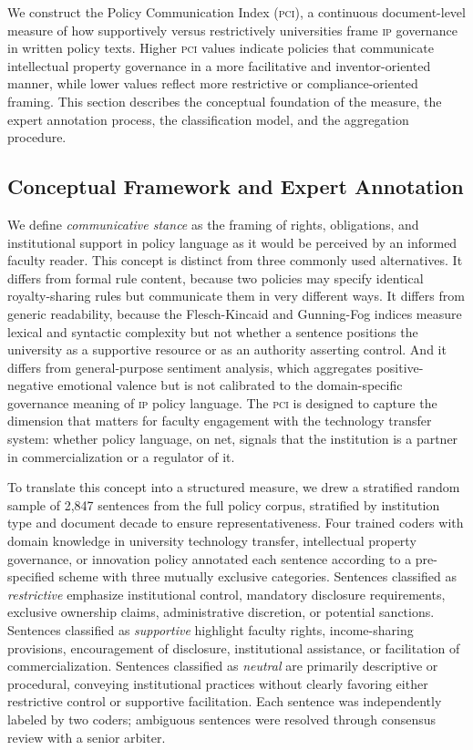 \documentclass[12pt]{article}
\newcommand{\PCI}{\textsc{pci}}
\newcommand{\IP}{\textsc{ip}}
\begin{document}
We construct the Policy Communication Index (\PCI), a continuous document-level
measure of how supportively versus restrictively universities frame \IP{} governance
in written policy texts.  Higher \PCI{} values indicate policies that communicate
intellectual property governance in a more facilitative and inventor-oriented manner,
while lower values reflect more restrictive or compliance-oriented framing.  This
section describes the conceptual foundation of the measure, the expert annotation
process, the classification model, and the aggregation procedure.

\subsection{Conceptual Framework and Expert Annotation}

We define \textit{communicative stance} as the framing of rights, obligations, and
institutional support in policy language as it would be perceived by an informed
faculty reader.  This concept is distinct from three commonly used alternatives.
It differs from formal rule content, because two policies may specify identical
royalty-sharing rules but communicate them in very different ways.  It differs from
generic readability, because the Flesch-Kincaid and Gunning-Fog indices measure
lexical and syntactic complexity but not whether a sentence positions the university as
a supportive resource or as an authority asserting control.  And it differs from
general-purpose sentiment analysis, which aggregates positive-negative emotional
valence but is not calibrated to the domain-specific governance meaning of \IP{} policy
language.  The \PCI{} is designed to capture the dimension that matters for faculty
engagement with the technology transfer system: whether policy language, on net,
signals that the institution is a partner in commercialization or a regulator of it.

To translate this concept into a structured measure, we drew a stratified random
sample of 2,847 sentences from the full policy corpus, stratified by institution type
and document decade to ensure representativeness.  Four trained coders with domain
knowledge in university technology transfer, intellectual property governance, or
innovation policy annotated each sentence according to a pre-specified scheme with
three mutually exclusive categories.  Sentences classified as \textit{restrictive}
emphasize institutional control, mandatory disclosure requirements, exclusive ownership
claims, administrative discretion, or potential sanctions.  Sentences classified as
\textit{supportive} highlight faculty rights, income-sharing provisions, encouragement
of disclosure, institutional assistance, or facilitation of commercialization.
Sentences classified as \textit{neutral} are primarily descriptive or procedural,
conveying institutional practices without clearly favoring either restrictive control
or supportive facilitation.  Each sentence was independently labeled by two coders;
ambiguous sentences were resolved through consensus review with a senior arbiter.
\end{document}
